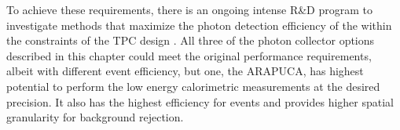 To achieve these requirements, there is an ongoing intense R\&D program to investigate methods that maximize the photon detection efficiency of the  within the constraints of the \single TPC design .  All three of the photon collector options described in this chapter could meet the original performance requirements, albeit with different event efficiency, but one, the ARAPUCA, has highest potential to perform the low energy calorimetric measurements at the desired precision. It also has the highest efficiency for  events and provides higher spatial granularity for background rejection. 





